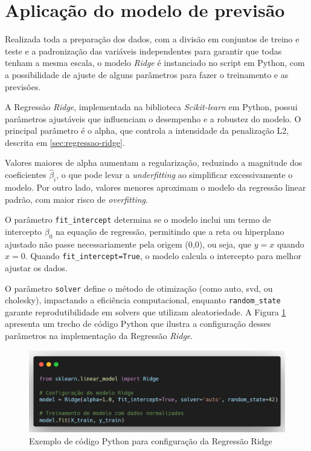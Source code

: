 \section{Aplicação do modelo de previsão}

Realizada toda a preparação dos dados, com a divisão em conjuntos de treino e teste e a padronização das variáveis independentes para garantir que todas tenham a mesma escala, o modelo \textit{Ridge} é instanciado no script em Python, com a possibilidade de ajuste de alguns parâmetros para fazer o treinamento e as previsões.

A Regressão \textit{Ridge}, implementada na biblioteca \textit{Scikit-learn} em Python, possui parâmetros ajustáveis que influenciam o desempenho e a robustez do modelo. O principal parâmetro é o alpha, que controla a intensidade da penalização L2, descrita em \ref{sec:regressao-ridge}.

Valores maiores de alpha aumentam a regularização, reduzindo a magnitude dos coeficientes $\hat{\beta}_i$, o que pode levar a \textit{underfitting} ao simplificar excessivamente o modelo. Por outro lado, valores menores aproximam o modelo da regressão linear padrão, com maior risco de \textit{overfitting}. 

O parâmetro \texttt{fit\_intercept} determina se o modelo inclui um termo de intercepto $\beta_0$ na equação de regressão, permitindo que a reta ou hiperplano ajustado não passe necessariamente pela origem (0,0), ou seja, que $y = x$ quando $x = 0$. Quando \texttt{fit\_intercept=True}, o modelo calcula o intercepto para melhor ajustar os dados. 

O parâmetro \texttt{solver} define o método de otimização (como auto, svd, ou cholesky), impactando a eficiência computacional, enquanto \texttt{random\_state} garante reprodutibilidade em solvers que utilizam aleatoriedade. A Figura \ref{fig:exemplo_codigo_ridge} apresenta um trecho de código Python que ilustra a configuração desses parâmetros na implementação da Regressão \textit{Ridge}.

\begin{figure}[H]
	\caption{\label{fig:exemplo_codigo_ridge} Exemplo de código Python para configuração da Regressão Ridge}
	\begin{center}
		\includegraphics[scale=0.3]{figuras/carbon.png}
	\end{center}
\end{figure}

